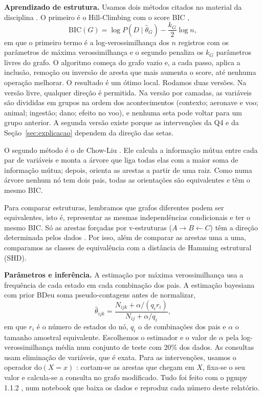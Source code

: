 \documentclass[10pt,a4paper,twocolumn]{article}
\begin{document}
\textbf{Aprendizado de estrutura.} Usamos dois métodos citados no material da disciplina
\citep{campos2025}. O primeiro é o Hill-Climbing com o score BIC \citep{schwarz1978},
\begin{equation}
\mathrm{BIC}(G)=\log P(D\mid\hat\theta_G)-\frac{k_G}{2}\log n,
\end{equation}
em que o primeiro termo é a log-verossimilhança dos $n$ registros com os parâmetros de máxima verossimilhança e o
segundo penaliza os $k_G$ parâmetros livres do grafo. O algoritmo começa do grafo vazio e, a cada passo, aplica a
inclusão, remoção ou inversão de aresta que mais aumenta o score, até nenhuma operação melhorar. O resultado é um ótimo
local. Rodamos duas versões. Na versão livre, qualquer direção é permitida. Na versão por camadas, as variáveis são
divididas em grupos na ordem dos acontecimentos (contexto; aeronave e voo; animal; ingestão; dano; efeito no voo), e
nenhuma seta pode voltar para um grupo anterior. A segunda versão existe porque as intervenções da Q4 e da
Seção~\ref{sec:explicacao} dependem da direção das setas.

O segundo método é o de Chow-Liu \citep{chow1968}. Ele calcula a informação mútua entre cada par de variáveis e
monta a árvore que liga todas elas com a maior soma de informação mútua; depois, orienta as arestas a partir de uma
raiz. Como numa árvore nenhum nó tem dois pais, todas as orientações são equivalentes e têm o mesmo BIC.

Para comparar estruturas, lembramos que grafos diferentes podem ser equivalentes, isto é, representar as mesmas
independências condicionais e ter o mesmo BIC. Só as arestas forçadas por v-estruturas ($A\to B\leftarrow C$) têm a
direção determinada pelos dados \citep{koller2009}. Por isso, além de comparar as arestas uma a uma, comparamos as
classes de equivalência com a distância de Hamming estrutural (SHD).

\textbf{Parâmetros e inferência.} A estimação por máxima verossimilhança usa a frequência de cada estado em cada
combinação dos pais. A estimação bayesiana com prior BDeu \citep{heckerman1995} soma pseudo-contagens antes de
normalizar,
\begin{equation}
\hat\theta_{ijk}=\frac{N_{ijk}+\alpha/(q_i r_i)}{N_{ij}+\alpha/q_i},
\end{equation}
em que $r_i$ é o número de estados do nó, $q_i$ o de combinações dos pais e $\alpha$ o tamanho amostral equivalente.
Escolhemos o estimador e o valor de $\alpha$ pela log-verossimilhança média num conjunto de teste com 20\% dos dados.
As consultas usam eliminação de variáveis, que é exata. Para as intervenções, usamos o operador $\mathrm{do}(X=x)$
\citep{pearl2009}: cortam-se as arestas que chegam em $X$, fixa-se o seu valor e calcula-se a consulta no grafo
modificado. Tudo foi feito com o pgmpy 1.1.2 \citep{ankan2015}, num notebook que baixa os dados e reproduz cada número
deste relatório.
\end{document}
